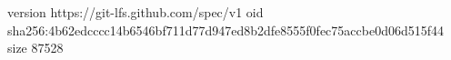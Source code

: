 version https://git-lfs.github.com/spec/v1
oid sha256:4b62edcccc14b6546bf711d77d947ed8b2dfe8555f0fec75accbe0d06d515f44
size 87528
